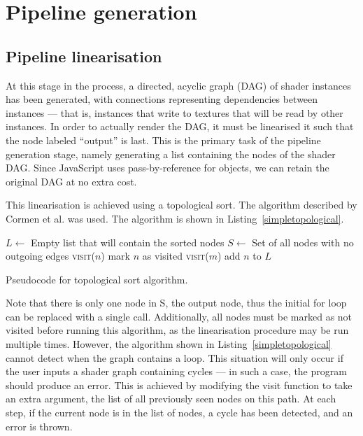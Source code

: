 \documentclass[12pt,twoside,notitlepage]{report}
\begin{document}
\clearpage
\section{Pipeline generation}
\subsection*{Pipeline linearisation}
At this stage in the process, a directed, acyclic graph (DAG) of shader instances has been generated, with connections representing dependencies between instances --- that is, instances that write to textures that will be read by other instances. In order to actually render the DAG, it must be linearised it such that the node labeled ``output'' is last. This is the primary task of the pipeline generation stage, namely generating a list containing the nodes of the shader DAG. Since JavaScript uses pass-by-reference for objects, we can retain the original DAG at no extra cost.

This linearisation is achieved using a topological sort. The algorithm described by Cormen et al.\citep[chap. 22.4]{topsort} was used. The algorithm is shown in Listing~\ref{simpletopological}.
\begin{algorithm}
\begin{algorithmic}
\State $L \gets $ Empty list that will contain the sorted nodes
\State $S \gets $ Set of all nodes with no outgoing edges
    \State \textsc{visit}($n$)
\EndFor 
{}
        mark $n$ as visited
            \State \textsc{visit}($m$)
        \EndFor
        \State add $n$ to $L$
    \EndIf
\EndFunction
\end{algorithmic}
\caption{Pseudocode for topological sort algorithm.\label{simpletopological}}
\end{algorithm}

Note that there is only one node in S, the output node, thus the initial for loop can be replaced with a single call. Additionally, all nodes must be marked as not visited before running this algorithm, as the linearisation procedure may be run multiple times. However, the algorithm shown in Listing~\ref{simpletopological} cannot detect when the graph contains a loop. This situation will only occur if the user inputs a shader graph containing cycles --- in such a case, the program should produce an error. This is achieved by modifying the visit function to take an extra argument, the list of all previously seen nodes on this path. At each step, if the current node is in the list of nodes, a cycle has been detected, and an error is thrown.
\end{document}
